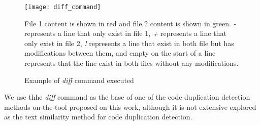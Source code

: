 \begin{figure}
\texttt{[image: diff\_command]}
\caption{Example of \textit{diff} command executed}
File 1 content is shown in red and file 2 content is shown in green. \textit{-} 
represents a line that only exist in file 1, \textit{+} represents a line that only exist in file 2,
\textit{!} represents a line that exist in both file but has modifications between them, and empty on the
start of a line represents that the line exist in both files without any modifications.
\label{fig:diff}
\end{figure}

We use thhe \textit{diff} command as the base of one of the code duplication detection methods 
on the tool proposed on this work, although it is not extensive explored as the text similarity
method for code duplication detection.

